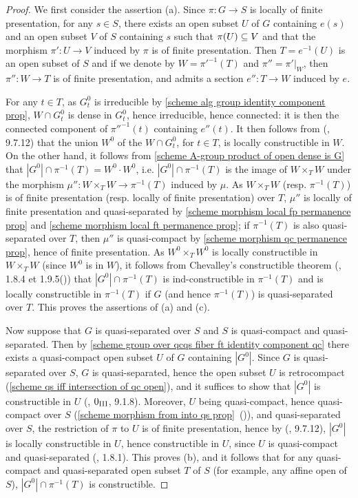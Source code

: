 \begin{proof}
We first consider the assertion (a). Since $\pi:G\to S$ is locally of finite presentation, for any $s\in S$, there exists an open subset $U$ of $G$ containing $e(s)$ and an open subset $V$ of $S$ containing $s$ such that $\pi(U)\subseteq V$ and that the morphism $\pi':U\to V$ induced by $\pi$ is of finite presentation. Then $T=e^{-1}(U)$ is an open subset of $S$ and if we denote by $W=\pi'^{-1}(T)$ and $\pi''=\pi'|_W$, then $\pi'':W\to T$ is of finite presentation, and admits a section $e'':T\to W$ induced by $e$.\par
For any $t\in T$, as $G_t^0$ is irreducible by \cref{scheme alg group identity component prop}, $W\cap G_t^0$ is dense in $G_t^0$, hence irreducible, hence connected: it is then the connected component of $\pi''^{-1}(t)$ containing $e''(t)$. It then follows from (\cite{EGA4-3}, 9.7.12) that the union $W^0$ of the $W\cap G_t^0$, for $t\in T$, is locally constructible in $W$. On the other hand, it follows from \cref{scheme A-group product of open dense is G} that $|G^0|\cap\pi^{-1}(T)=W^0\cdot W^0$, i.e. $|G^0|\cap\pi^{-1}(T)$ is the image of $W\times_TW$ under the morphism $\mu'':W\times_TW\to\pi^{-1}(T)$ induced by $\mu$. As $W\times_TW$ (resp. $\pi^{-1}(T)$) is of finite presentation (resp. locally of finite presentation) over $T$, $\mu''$ is locally of finite presentation and quasi-separated by \cref{scheme morphism local fp permanence prop} and \cref{scheme morphism local ft permanence prop}; if $\pi^{-1}(T)$ is also quasi-separated over $T$, then $\mu''$ is quasi-compact by \cref{scheme morphism qc permanence prop}, hence of finite presentation. As $W^0\times_TW^0$ is locally constructible in $W\times_TW$ (since $W^0$ is in $W$), it follows from Chevalley's constructible theorem (\cite{EGA4-1}, 1.8.4 et 1.9.5()) that $|G^0|\cap\pi^{-1}(T)$ is ind-constructible in $\pi^{-1}(T)$ and is locally constructible in $\pi^{-1}(T)$ if $G$ (and hence $\pi^{-1}(T)$) is quasi-separated over $T$. This proves the assertions of (a) and (c).\par
Now suppose that $G$ is quasi-separated over $S$ and $S$ is quasi-compact and quasi-separated. Then by \cref{scheme group over qcqs fiber ft identity component qc} there exists a quasi-compact open subset $U$ of $G$ containing $|G^0|$. Since $G$ is quasi-separated over $S$, $G$ is quasi-separated, hence the open subset $U$ is retrocompact (\cref{scheme qs iff intersection of qc open}), and it suffices to show that $|G^0|$ is constructible in $U$ (\cite{EGA3-1}, $0_{\Rmnum{3}}$, 9.1.8). Moreover, $U$ being quasi-compact, hence quasi-compact over $S$ (\cref{scheme morphism from into qs prop}~()), and quasi-separated over $S$, the restriction of $\pi$ to $U$ is of finite presentation, hence by (\cite{EGA4-3}, 9.7.12), $|G^0|$ is locally constructible in $U$, hence constructible in $U$, since $U$ is quasi-compact and quasi-separated (\cite{EGA4-1}, 1.8.1). This proves (b), and it follows that for any quasi-compact and quasi-separated open subset $T$ of $S$ (for example, any affine open of $S$), $|G^0|\cap\pi^{-1}(T)$ is constructible.
\end{proof}

